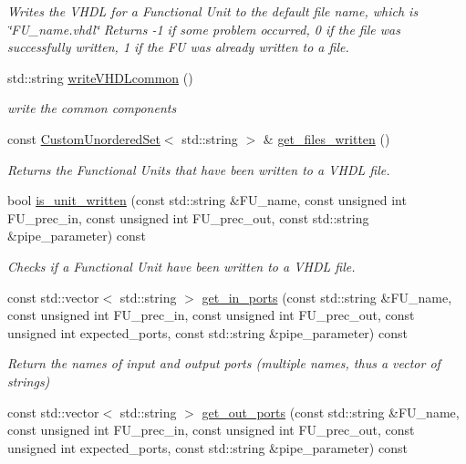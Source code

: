 \begin{DoxyCompactItemize}
\begin{DoxyCompactList}\small\item\em Writes the V\+H\+DL for a Functional Unit to the default file name, which is \char`\"{}\+F\+U\+\_\+name.\+vhdl\char`\"{} Returns -\/1 if some problem occurred, 0 if the file was successfully written, 1 if the FU was already written to a file. \end{DoxyCompactList}\item 
std\+::string \hyperlink{classflopoco__wrapper_a64395db4a7b5f9b7a716dac3907c838f}{write\+V\+H\+D\+Lcommon} ()
\begin{DoxyCompactList}\small\item\em write the common components \end{DoxyCompactList}\item 
const \hyperlink{classCustomUnorderedSet}{Custom\+Unordered\+Set}$<$ std\+::string $>$ \& \hyperlink{classflopoco__wrapper_aac67dab400a5a7d2ab1bbeed047e3a57}{get\+\_\+files\+\_\+written} ()
\begin{DoxyCompactList}\small\item\em Returns the Functional Units that have been written to a V\+H\+DL file. \end{DoxyCompactList}\item 
bool \hyperlink{classflopoco__wrapper_ac7bd64c1720604606984f0f020fdbf54}{is\+\_\+unit\+\_\+written} (const std\+::string \&F\+U\+\_\+name, const unsigned int F\+U\+\_\+prec\+\_\+in, const unsigned int F\+U\+\_\+prec\+\_\+out, const std\+::string \&pipe\+\_\+parameter) const
\begin{DoxyCompactList}\small\item\em Checks if a Functional Unit have been written to a V\+H\+DL file. \end{DoxyCompactList}\item 
const std\+::vector$<$ std\+::string $>$ \hyperlink{classflopoco__wrapper_a833928904625afde91a9c1d6ac78e35c}{get\+\_\+in\+\_\+ports} (const std\+::string \&F\+U\+\_\+name, const unsigned int F\+U\+\_\+prec\+\_\+in, const unsigned int F\+U\+\_\+prec\+\_\+out, const unsigned int expected\+\_\+ports, const std\+::string \&pipe\+\_\+parameter) const
\begin{DoxyCompactList}\small\item\em Return the names of input and output ports (multiple names, thus a vector of strings) \end{DoxyCompactList}\item 
const std\+::vector$<$ std\+::string $>$ \hyperlink{classflopoco__wrapper_ac68016486d105000e2df59fc924eec32}{get\+\_\+out\+\_\+ports} (const std\+::string \&F\+U\+\_\+name, const unsigned int F\+U\+\_\+prec\+\_\+in, const unsigned int F\+U\+\_\+prec\+\_\+out, const unsigned int expected\+\_\+ports, const std\+::string \&pipe\+\_\+parameter) const
\end{DoxyCompactItemize}
